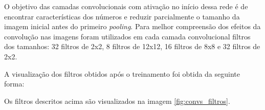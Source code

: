 \documentclass[
	12pt,				%
	oneside,			%
	a4paper,			%
	english,			%
	french,				%
	spanish,			%
	brazil,				%
	]{abntex2}
\begin{document}


\par O objetivo das camadas convolucionais com ativação no início dessa rede é de encontrar características dos números e reduzir parcialmente o tamanho da imagem inicial antes do primeiro \textit{pooling}. Para melhor compreensão dos efeitos da convolução nas imagens foram utilizados em cada camada convolucional filtros dos tamanhos: 32 filtros de 2x2, 8 filtros de 12x12, 16 filtros de 8x8 e 32 filtros de 2x2.

\par A visualização dos filtros obtidos após o treinamento foi obtida da seguinte forma:




\par Os filtros descritos acima são visualizados na imagem \autoref{fig:convs_filtros}.
\end{document}
